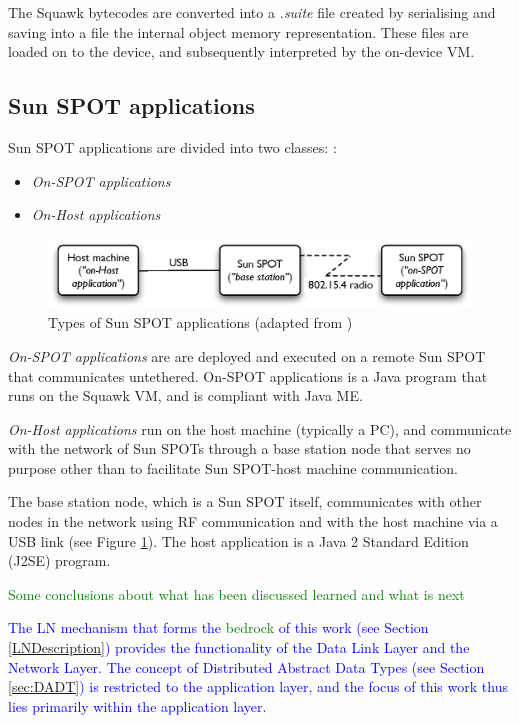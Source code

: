 The Squawk bytecodes are converted into a \emph{.suite} file created by
serialising and saving into a file the internal object memory representation.
These files are loaded on to the device, and subsequently interpreted by the
on-device VM.

\subsection{Sun SPOT applications} \label{subsec:sunspotapps}

Sun SPOT applications are divided into two classes:
\cite{sun_developer:2008}:

\begin{itemize}
  \item \emph{On-SPOT applications}
  \item \emph{On-Host applications}
\end{itemize}

\begin{figure}
\centering
\includegraphics[width=\textwidth]{img/SunSPOTS_applications.eps} 
\caption[Types of Sun SPOT applications]{Types of Sun SPOT applications (adapted from
\cite{sun_developer:2008})}
\label{Fig:SunSPOTS_applications}
\end{figure}  

\emph{On-SPOT applications} are are deployed and
executed on a remote Sun SPOT that communicates untethered. On-SPOT
applications is a Java program that runs on the Squawk VM, and is compliant
with Java ME. 

\emph{On-Host applications} run on the host machine
(typically a PC), and communicate with the network of Sun SPOTs through a base
station node that serves no purpose other than to facilitate Sun SPOT-host
machine communication. 
  
The base station node, which is a Sun SPOT itself, communicates with other
nodes in the network using RF communication and with the host machine via a
USB link (see Figure \ref{Fig:SunSPOTS_applications}). The host application is
a Java 2 Standard Edition (J2SE) program.
  
 

\textcolor{green}{Some conclusions about what has been discussed learned and
what is next}


\textcolor{blue}{The LN mechanism that forms the \textcolor{green}{bedrock} of this work (see Section \ref{LNDescription}) provides the functionality of the Data Link Layer and the Network Layer. The concept of Distributed Abstract
Data Types (see Section \ref{sec:DADT}) is restricted to the application layer, and the focus of this work thus lies primarily within the application layer.}

  